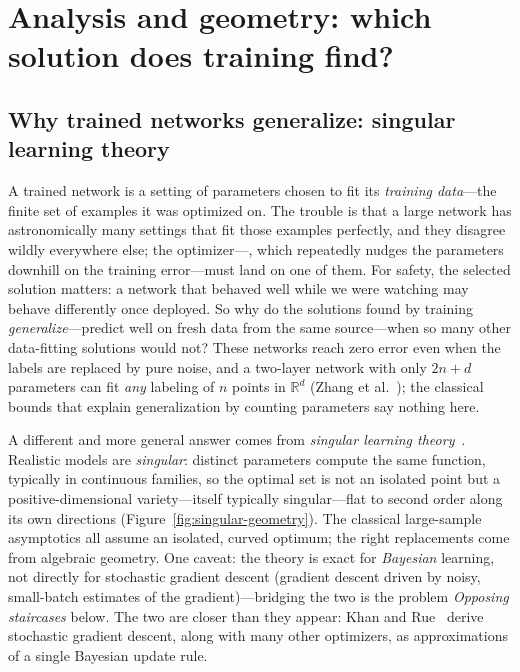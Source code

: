 \section{Analysis and geometry: which solution does training find?}
\label{sec:analysis}

\subsection{Why trained networks generalize: singular learning theory}

A trained network is a setting of parameters chosen to fit its \emph{training data}---the finite set of examples it was optimized on. The trouble is that a large network has astronomically many settings that fit those examples perfectly, and they disagree wildly everywhere else; the optimizer---, which repeatedly nudges the parameters downhill on the training error---must land on one of them. For safety, the selected solution matters: a network that behaved well while we were watching may behave differently once deployed. So why do the solutions found by training \emph{generalize}---predict well on fresh data from the same source---when so many other data-fitting solutions would not? These networks reach zero error even when the labels are replaced by pure noise, and a two-layer network with only $2n+d$ parameters can fit \emph{any} labeling of $n$ points in $\mathbb{R}^d$ (Zhang et al.~\cite{zhang2017}); the classical bounds that explain generalization by counting parameters say nothing here.

A different and more general answer comes from \emph{singular learning theory}~\cite{watanabe2009}. Realistic models are \emph{singular}: distinct parameters compute the same function, typically in continuous families, so the optimal set is not an isolated point but a positive-dimensional variety---itself typically singular---flat to second order along its own directions (Figure~\ref{fig:singular-geometry}). The classical large-sample asymptotics all assume an isolated, curved optimum; the right replacements come from algebraic geometry. One caveat: the theory is exact for \emph{Bayesian} learning, not directly for stochastic gradient descent (gradient descent driven by noisy, small-batch estimates of the gradient)---bridging the two is the problem \emph{Opposing staircases} below. The two are closer than they appear: Khan and Rue~\cite{khan2023} derive stochastic gradient descent, along with many other optimizers, as approximations of a single Bayesian update rule.


